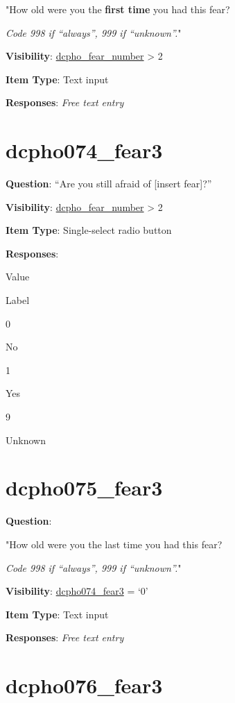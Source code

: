 \documentclass[]{book}
\begin{document}
"How old were you the \textbf{first time} you had this fear?

\emph{Code 998 if ``always'', 999 if ``unknown''.}"

\textbf{Visibility}: \protect\hyperlink{dcpho_fear_number}{dcpho\_fear\_number} \textgreater{} 2

\textbf{Item Type}: Text input

\textbf{Responses}: \emph{Free text entry}

\hypertarget{dcpho074_fear3}{%
\section{dcpho074\_fear3}\label{dcpho074_fear3}}

\textbf{Question}: ``Are you still afraid of {[}insert fear{]}?''

\textbf{Visibility}: \protect\hyperlink{dcpho_fear_number}{dcpho\_fear\_number} \textgreater{} 2

\textbf{Item Type}: Single-select radio button

\textbf{Responses}:

Value

Label

0

No

1

Yes

9

Unknown

\hypertarget{dcpho075_fear3}{%
\section{dcpho075\_fear3}\label{dcpho075_fear3}}

\textbf{Question}:

"How old were you the last time you had this fear?

\emph{Code 998 if ``always'', 999 if ``unknown''.}"

\textbf{Visibility}: \protect\hyperlink{dcpho074_fear3}{dcpho074\_fear3} = `0'

\textbf{Item Type}: Text input

\textbf{Responses}: \emph{Free text entry}

\hypertarget{dcpho076_fear3}{%
\section{dcpho076\_fear3}\label{dcpho076_fear3}}
\end{document}
